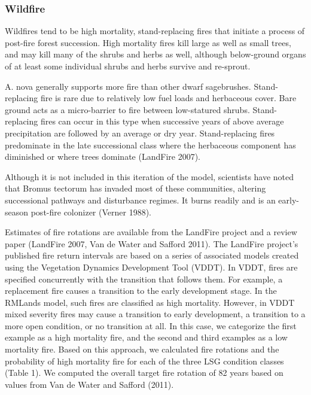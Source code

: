 \subsubsection{Wildfire}
Wildfires tend to be high mortality, stand-replacing fires that initiate a process of post-fire forest succession. High mortality fires kill large as well as small trees, and may kill many of the shrubs and herbs as well, although below-ground organs of at least some individual shrubs and herbs survive and re-sprout. 

A. nova generally supports more fire than other dwarf sagebrushes. Stand-replacing fire is rare due to relatively low fuel loads and herbaceous cover. Bare ground acts as a micro-barrier to fire between low-statured shrubs. Stand-replacing fires can occur in this type when successive years of above average precipitation are followed by an average or dry year. Stand-replacing fires predominate in the late successional class where the herbaceous component has diminished or where trees dominate (LandFire 2007).

Although it is not included in this iteration of the model, scientists have noted that Bromus tectorum has invaded most of these communities, altering successional pathways and disturbance regimes. It burns readily and is an early-season post-fire colonizer (Verner 1988).

Estimates of fire rotations are available from the LandFire project and a review paper (LandFire 2007, Van de Water and Safford 2011). The LandFire project’s published fire return intervals are based on a series of associated models created using the Vegetation Dynamics Development Tool (VDDT). In VDDT, fires are specified concurrently with the transition that follows them. For example, a replacement fire causes a transition to the early development stage. In the RMLands model, such fires are classified as high mortality. However, in VDDT mixed severity fires may cause a transition to early development, a transition to a more open condition, or no transition at all. In this case, we categorize the first example as a high mortality fire, and the second and third examples as a low mortality fire. Based on this approach, we calculated fire rotations and the probability of high mortality fire for each of the three LSG condition classes (Table 1). We computed the overall target fire rotation of 82 years based on values from Van de Water and Safford (2011). 





